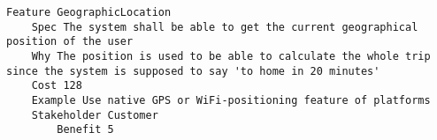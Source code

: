 

\begin{lstlisting}
Feature GeographicLocation
	Spec The system shall be able to get the current geographical position of the user
	Why The position is used to be able to calculate the whole trip since the system is supposed to say 'to home in 20 minutes' 
	Cost 128
	Example Use native GPS or WiFi-positioning feature of platforms
	Stakeholder Customer
		Benefit 5

\end{lstlisting}
